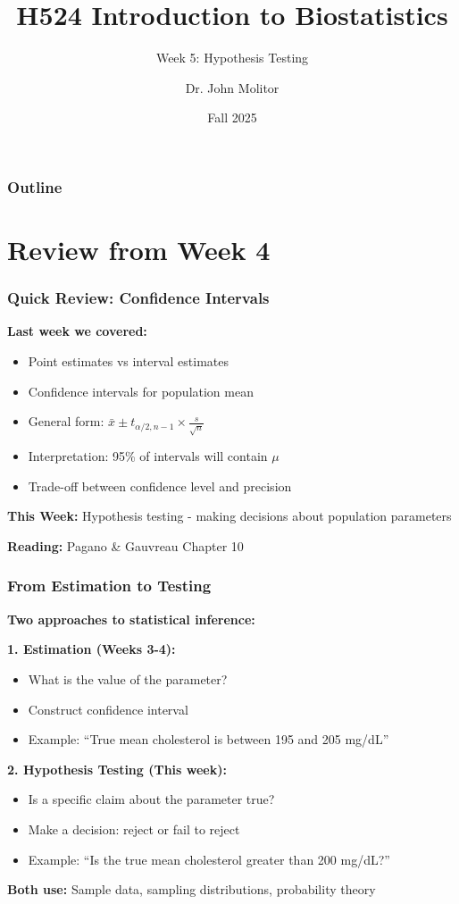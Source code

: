 \documentclass{beamer}
\title{H524 Introduction to Biostatistics}
\subtitle{Week 5: Hypothesis Testing}
\author{Dr. John Molitor}
\institute{}
\date{Fall 2025}
\begin{document}
\frame{\titlepage}

\begin{frame}
\frametitle{Outline}
\tableofcontents
\end{frame}

\section{Review from Week 4}

\begin{frame}
\frametitle{Quick Review: Confidence Intervals}
\textbf{Last week we covered:}
\begin{itemize}
\item Point estimates vs interval estimates
\item Confidence intervals for population mean
\item General form: $\bar{x} \pm t_{\alpha/2, n-1} \times \frac{s}{\sqrt{n}}$
\item Interpretation: 95\% of intervals will contain $\mu$
\item Trade-off between confidence level and precision
\end{itemize}

\vspace{0.5cm}
\textbf{This Week:} Hypothesis testing - making decisions about population parameters

\vspace{0.3cm}
\textbf{Reading:} Pagano \& Gauvreau Chapter 10
\end{frame}

\begin{frame}
\frametitle{From Estimation to Testing}
\textbf{Two approaches to statistical inference:}

\vspace{0.5cm}
\textbf{1. Estimation (Weeks 3-4):}
\begin{itemize}
\item What is the value of the parameter?
\item Construct confidence interval
\item Example: ``True mean cholesterol is between 195 and 205 mg/dL''
\end{itemize}

\vspace{0.5cm}
\textbf{2. Hypothesis Testing (This week):}
\begin{itemize}
\item Is a specific claim about the parameter true?
\item Make a decision: reject or fail to reject
\item Example: ``Is the true mean cholesterol greater than 200 mg/dL?''
\end{itemize}

\vspace{0.5cm}
\textbf{Both use:} Sample data, sampling distributions, probability theory
\end{frame}
\end{document}
